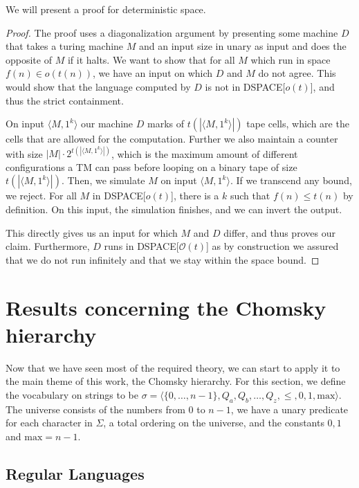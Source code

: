 We will present a proof for deterministic space.
\begin{proof}
    The proof uses a diagonalization argument by presenting some machine $D$ that takes a turing machine $M$ and an input size in unary as input and does the opposite of $M$ if it halts.
    We want to show that for all $M$ which run in space $f(n) \in o(t(n))$, we have an input on which $D$ and $M$ do not agree.
    This would show that the language computed by $D$ is not in DSPACE[$o(t)$], and thus the strict containment.

    On input $\langle M, 1^{k} \rangle$ our machine $D$ marks of $t(|\langle M, 1^{k} \rangle|)$ tape cells, which are the cells that are allowed for the computation.
    Further we also maintain a counter with size $|M|\cdot 2^{t(|\langle M, 1^{k} \rangle|)}$, which is the maximum amount of different configurations a TM can pass before looping on a binary tape of size $t(|\langle M, 1^{k} \rangle|)$.
    Then, we simulate $M$ on input $\langle M, 1^{k} \rangle$.
    If we transcend any bound, we reject.
    For all $M$ in DSPACE[$o(t)$], there is a $k$ such that $f(n) \leq t(n)$ by definition.
    On this input, the simulation finishes, and we can invert the output.

    This directly gives us an input for which $M$ and $D$ differ, and thus proves our claim.
    Furthermore, $D$ runs in DSPACE[$\mathcal{O}(t)$] as by construction we assured that we do not run infinitely and that we stay within the space bound.
\end{proof}


\section{Results concerning the Chomsky hierarchy}\label{sec:results-concerning-the-chomsky-hierarchy}

Now that we have seen most of the required theory, we can start to apply it to the main theme of this work, the Chomsky hierarchy.
For this section, we define the vocabulary on strings to be $\sigma = \langle \{0, \dots, n - 1\}, Q_a, Q_b, \dots, Q_z, \leq , 0, 1, \text{max} \rangle$.
The universe consists of the numbers from $0$ to $n - 1$, we have a unary predicate for each character in $\Sigma$, a total ordering on the universe, and the constants $0, 1$ and $\text{max} = n - 1$.


\subsection{Regular Languages}\label{subsec:des-regular-languages}

